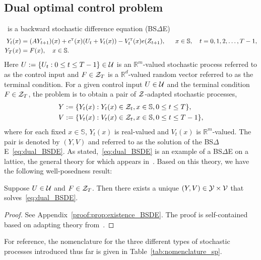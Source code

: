 \documentclass[twoside,11pt]{article}
\def\Re{\mathbb{R}}
\newcommand{\field}[1]{\mathbb{#1}}
\def\Re{\field{R}}
\def\transpose{{\hbox{\rm\tiny T}}}
\def\clZ{{\cal Z}}
\def\clZ{{\cal Z}}
\def\bS{\begin{slide}}
\newcommand{\newP}[1]{\medskip\noindent{\bf #1:}}
\def\Re{\mathbb{R}}
\def\clY{{\cal Y}}
\def\clZ{{\cal Z}}
\renewcommand{\Re}{\mathbb{R}}
\def\clU{{\cal U}}
\def\clV{{\cal V}}
\def\clY{{\cal Y}}
\def\clZ{{\cal Z}}
\def\bS{\mathbb{S}}
\begin{document}
\subsection{Dual optimal control problem}
\newP{1. Dynamic constraint}~is a backward stochastic difference equation  (BS$\Delta$E) 
\begin{subequations}\label{eq:dual_BSDE}
  \begin{align}
    Y_t(x) &= (AY_{t+1})(x) + c^\transpose(x) (U_t + V_t(x)) - V_t^\transpose(x)
            e(Z_{t+1}),
      \quad \;\; x\in\bS,\quad t=0,1,2,\hdots,T-1, \label{eq:dual_BSDE_a}\\
    Y_T(x)  & = F(x),\quad x\in\bS.  \label{eq:dual_BSDE_b}
  \end{align}
\end{subequations}
Here $U:=\{U_t:0\leq t\leq T-1\} \in \clU$ is an $\Re^m$-valued stochastic process referred to as the control input and $F\in \clZ_T$ is a $\Re^d$-valued random vector referred to as the terminal condition.  
For a given control input $U\in \clU$ and the terminal condition $F\in \clZ_T$, the problem is to obtain a pair of $\clZ$-adapted stochastic processes,
\begin{align*}
  Y&:=\{Y_t(x): Y_t(x)\in\clZ_t, x\in\bS,  0\leq t\leq T\},\\
  V&:=\{V_t(x): V_t(x)\in\clZ_t, x\in\bS,  0\leq t\leq T-1\},
\end{align*}
where for each fixed $x\in\bS$, $Y_t(x)$ is real-valued and $V_t(x)$ is $\Re^m$-valued.
The pair is denoted by $(Y,V)$ and referred to as the solution of the
BS$\Delta$E~\eqref{eq:dual_BSDE}.
As stated,~\eqref{eq:dual_BSDE} is an example of a BS$\Delta$E on a lattice, the general theory for which appears in~\citep{fukasawa2025backward}. 
Based on this theory, we have the following well-posedness result:



\begin{proposition}\label{prop:existence_BSDE}
Suppose $U \in \clU$ and $F\in \clZ_T$.  
Then there exists a unique $(Y,V) \in \clY \times \clV$ that solves~\eqref{eq:dual_BSDE}. 
\end{proposition}
\medskip
\begin{proof}
  See Appendix~\ref{proof:prop:existence_BSDE}.  
  The proof is self-contained based on adapting theory from~\citep{fukasawa2025backward}. 
\end{proof}


For reference, the nomenclature for the three different types of stochastic
processes introduced thus far is given in Table~\ref{tab:nomenclature_sp}.
\end{document}
